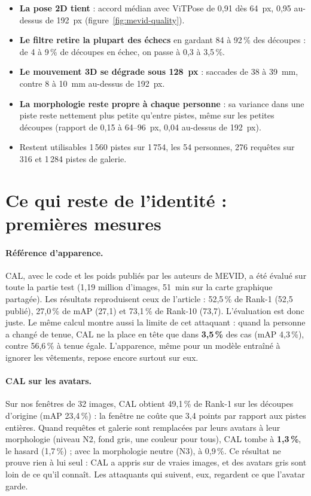 \documentclass[11pt,a4paper]{report}
\begin{document}
\begin{itemize}
    \item \textbf{La pose 2D tient} : accord médian avec ViTPose de 0,91 dès 64~px, 0,95 au-dessus de 192~px
    (figure~\ref{fig:mevid-quality}).
    \item \textbf{Le filtre retire la plupart des échecs} en gardant 84 à 92\,\% des découpes : de 4 à 9\,\% de découpes en échec, on
    passe à 0,3 à 3,5\,\%.
    \item \textbf{Le mouvement 3D se dégrade sous 128~px} : saccades de 38 à 39~mm, contre 8 à 10~mm au-dessus de 192~px.
    \item \textbf{La morphologie reste propre à chaque personne} : sa variance dans une piste reste nettement plus petite qu'entre
    pistes, même sur les petites découpes (rapport de 0,15 à 64--96~px, 0,04 au-dessus de 192~px).
    \item Restent utilisables 1\,560 pistes sur 1\,754, les 54 personnes, 276 requêtes sur 316 et 1\,284 pistes de galerie.
\end{itemize}

\section{Ce qui reste de l'identité : premières mesures}
\label{sec:res-identity}

\paragraph{Référence d'apparence.} CAL, avec le code et les poids publiés par les auteurs de MEVID, a été évalué sur toute la
partie test (1,19 million d'images, 51~min sur la carte graphique partagée). Les résultats reproduisent ceux de l'article : 52,5\,\% de
Rank-1 (52,5 publié), 27,0\,\% de mAP (27,1) et 73,1\,\% de Rank-10 (73,7). L'évaluation est donc juste. Le même calcul montre
aussi la limite de cet attaquant : quand la personne a changé de tenue, CAL ne la place en tête que dans \textbf{3,5\,\%} des cas
(mAP 4,3\,\%), contre 56,6\,\% à tenue égale. L'apparence, même pour un modèle entraîné à ignorer les vêtements, repose encore
surtout sur eux.

\paragraph{CAL sur les avatars.} Sur nos fenêtres de 32 images, CAL obtient 49,1\,\% de Rank-1 sur les découpes d'origine
(mAP 23,4\,\%) : la fenêtre ne coûte que 3,4 points par rapport aux pistes entières. Quand requêtes et galerie sont remplacées par
leurs avatars à leur morphologie (niveau N2, fond gris, une couleur pour tous), CAL tombe à \textbf{1,3\,\%}, le hasard (1,7\,\%) ; avec la morphologie neutre (N3), à 0,9\,\%.
Ce résultat ne prouve rien à lui seul : CAL a appris sur de vraies images, et des avatars gris sont loin de ce qu'il connaît. Les
attaquants qui suivent, eux, regardent ce que l'avatar garde.
\end{document}
